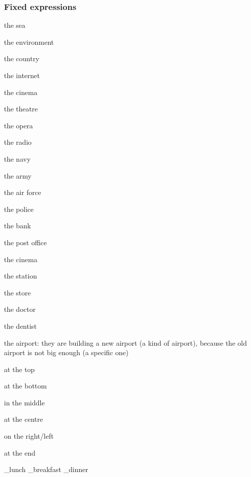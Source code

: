 \documentclass[10pt,a4paper]{article}
\newcommand\za{\_\thinspace }                         %
\begin{document}
\subsubsection{Fixed expressions}
\begin{description}[leftmargin=0.3cm,style=nextline,before={\renewcommand\makelabel[1]{##1 }}]
\begin{minipage}{0.3\linewidth}
  \item[] the sea
  \item[] the environment
  \item[] the country
  \item[] the internet
  \item[] the cinema
  \item[] the theatre
  \item[] the opera
  \item[] the radio
  \item[] the navy
  \item[] the army
  \item[] the air force
  \item[] the police
\end{minipage}
\hspace{10mm}
\begin{minipage}{0.5\linewidth}
  \item[] the bank
  \item[] the post office
  \item[] the cinema
  \item[] the station
  \item[] the store
  \item[] the doctor
  \item[] the dentist
  \item[] the airport: they are building a new airport (a kind of airport), because the old airport is not big enough (a specific one)
\end{minipage}
\end{description}


\begin{multicols}{3}
at the top

at the bottom

in the middle

at the centre

on the right/left

at the end
\end{multicols}

\begin{multicols}{3}
\za lunch
\za breakfast
\za dinner
\end{multicols}
\end{document}
